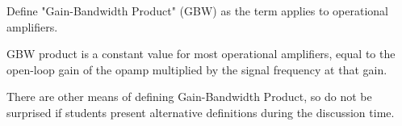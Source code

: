 

Define "Gain-Bandwidth Product" (GBW) as the term applies to operational amplifiers.







GBW product is a constant value for most operational amplifiers, equal to the open-loop gain of the opamp multiplied by the signal frequency at that gain.







There are other means of defining Gain-Bandwidth Product, so do not be surprised if students present alternative definitions during the discussion time.





